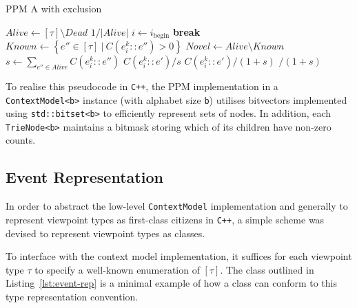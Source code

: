 \documentclass[12pt,a4paper,twoside,openright]{report}
\newcommand{\set}[1]{ \left\{ #1 \right\} }
\begin{document}
\begin{algorithm}[H]
  \caption{PPM A with exclusion}
  \label{alg:ppm-a}
  \begin{algorithmic}[1]
      \State $\textit{Alive} \gets [\tau] \setminus \textit{Dead}$
      \State \Return $1 / |\textit{Alive}|$ 
      \EndIf
      \State $i \gets i_{\mathrm{begin}}$
       \textbf{break}
        \EndIf       
      \EndFor 
      \State $\textit{Known} \gets \set{ e'' \in [\tau]\ |\ C(e_i^k :: e'') > 0 }$
      \State $\textit{Novel} \gets Alive \setminus Known$ 
      \State $s \gets \sum_{e'' \in \textit{Alive}} C(e_i^k :: e'')$ 
        \State \Return $C(e_i^k :: e') / s$ 
      \EndIf
      \State \Return $C(e_i^k::e') / (1 + s)$ 
      \EndIf
      \State \Return {}$ / (1
      + s)$ 
    \EndFunction
  \end{algorithmic}
\end{algorithm}

To realise this pseudocode in \texttt{C++}, the PPM implementation in a
\texttt{ContextModel<b>} instance (with alphabet size \texttt{b}) utilises
bitvectors implemented using \texttt{std::bitset<b>} to efficiently represent
sets of nodes. In addition, each \texttt{TrieNode<b>} maintains a bitmask
storing which of its children have non-zero counts.
 
\subsection{Event Representation}\label{sec:cpp-event-rep}

In order to abstract the low-level \texttt{ContextModel} implementation and
generally to represent viewpoint types as first-class citizens in \texttt{C++},
a simple scheme was devised to represent viewpoint types as classes.

To interface with the context model implementation, it suffices for each
viewpoint type $\tau$ to specify a well-known enumeration of $[\tau]$. The class
outlined in Listing~\ref{lst:event-rep} is a minimal example of how a class can
conform to this type representation convention.
\end{document}
